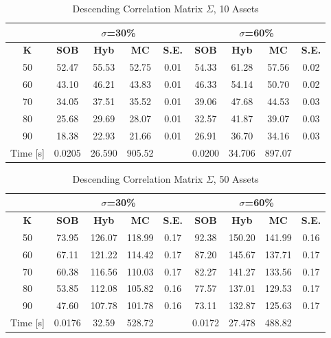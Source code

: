 \documentclass[a4paper]{article}
\begin{document}
\begin {table}
\caption {Descending Correlation Matrix $\Sigma$, 10 Assets} 
\begin{center}
\begin{tabular}{c|c c c c|c c c c}
\hline
\multicolumn{1}{c|}{} & \multicolumn{4}{|c|}{$\sigma$=30\%} & \multicolumn{4}{|c}{$\sigma$=60\%} \\ 
\hline
  \textbf{K} & \textbf{SOB} & \textbf{Hyb}	& \textbf{MC} & \textbf{S.E.} & \textbf{SOB} & \textbf{Hyb} & \textbf{MC} & \textbf{S.E.} \\
50 &	52.47	&	55.53	&	52.75	& 0.01	&	54.33	&	61.28	&	57.56 &	0.02 \\
60 & 	43.10	& 	46.21	& 	43.83 	& 0.01  &46.33 & 54.14 & 50.70& 0.02 \\
70 & 34.05 	& 37.51&35.52& 0.01& 39.06&47.68& 44.53 &0.03 \\
80 & 	25.68	&  29.69&28.07&0.01& 32.57& 41.87&39.07&0.03 \\
90 & 18.38 	& 22.93& 21.66 &0.01 & 26.91 &36.70 & 34.16 & 0.03 \\
\hline
Time [s] &0.0205 & 26.590 & 905.52 & &0.0200 &34.706& 897.07 & \\
\hline
\end{tabular}
\end{center}
\end{table}

\begin {table}
\caption {Descending Correlation Matrix $\Sigma$, 50 Assets} 
\begin{center}
\begin{tabular}{c|c c c  c|c c c c}
\hline
\multicolumn{1}{c|}{} & \multicolumn{4}{|c|}{$\sigma$=30\%} & \multicolumn{4}{|c}{$\sigma$=60\%} \\ 
\hline
  \textbf{K} & \textbf{SOB} & \textbf{Hyb}	& \textbf{MC}& \textbf{S.E.} & \textbf{SOB} & \textbf{Hyb} & \textbf{MC}& \textbf{S.E.} \\
50 &73.95&126.07&118.99&0.17& 92.38 &  150.20&141.99 &0.16  \\
60 &67.11&121.22&114.42&0.17& 87.20&  145.67&137.71 &0.17\\
70 &60.38&116.56&110.03&0.17& 82.27& 141.27 & 133.56 &0.17\\
80 &53.85&112.08&105.82& 0.16& 77.57& 137.01& 129.53 &0.17\\
90 &47.60&107.78&101.78& 0.16& 73.11&  132.87& 125.63 &0.17\\
\hline
Time [s] &0.0176 &32.59 &528.72 & &0.0172 &27.478&488.82 \\
\hline
\end{tabular}
\end{center}
\end{table}
\end{document}
